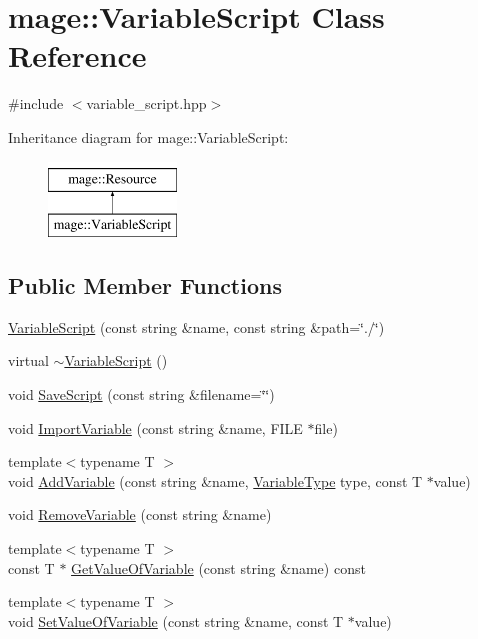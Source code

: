 \hypertarget{classmage_1_1_variable_script}{}\section{mage\+:\+:Variable\+Script Class Reference}
\label{classmage_1_1_variable_script}


{\ttfamily \#include $<$variable\+\_\+script.\+hpp$>$}

Inheritance diagram for mage\+:\+:Variable\+Script\+:\begin{figure}[H]
\begin{center}
\leavevmode
\includegraphics[height=2.000000cm]{classmage_1_1_variable_script}
\end{center}
\end{figure}
\subsection*{Public Member Functions}
\begin{DoxyCompactItemize}
\item 
\hyperlink{classmage_1_1_variable_script_a8b40c66f4f025bbf85b60ac57eb92248}{Variable\+Script} (const string \&name, const string \&path=\char`\"{}./\char`\"{})
\item 
virtual \hyperlink{classmage_1_1_variable_script_a8c488e779a6444559bded669a3e038c8}{$\sim$\+Variable\+Script} ()
\item 
void \hyperlink{classmage_1_1_variable_script_a5978531646433245466e158cd48c9a51}{Save\+Script} (const string \&filename=\char`\"{}\char`\"{})
\item 
void \hyperlink{classmage_1_1_variable_script_ae7ab24f4d3bb11579ce9cfb690ba7a4f}{Import\+Variable} (const string \&name, F\+I\+LE $\ast$file)
\item 
{\footnotesize template$<$typename T $>$ }\\void \hyperlink{classmage_1_1_variable_script_aa9a8bb9b6133ce853052820961320ca9}{Add\+Variable} (const string \&name, \hyperlink{namespacemage_a530428e73bac0ba7fe84b29086a9e33a}{Variable\+Type} type, const T $\ast$value)
\item 
void \hyperlink{classmage_1_1_variable_script_a4970ef4faafb1a6a43c4648ec9f36cce}{Remove\+Variable} (const string \&name)
\item 
{\footnotesize template$<$typename T $>$ }\\const T $\ast$ \hyperlink{classmage_1_1_variable_script_a231b83e1e32b882489ed90faa69f7137}{Get\+Value\+Of\+Variable} (const string \&name) const
\item 
{\footnotesize template$<$typename T $>$ }\\void \hyperlink{classmage_1_1_variable_script_a1b6daa6b226e43564408ab54e4c65eb7}{Set\+Value\+Of\+Variable} (const string \&name, const T $\ast$value)
\end{DoxyCompactItemize}
